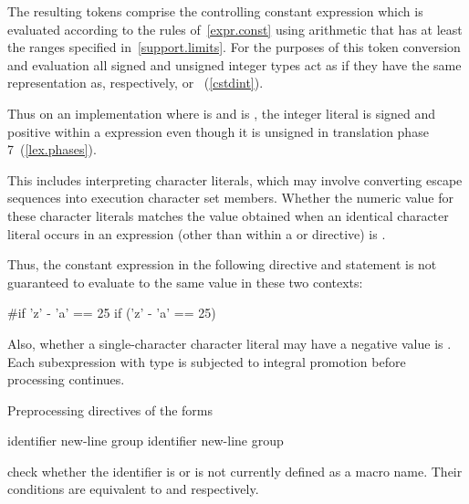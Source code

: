 \pnum
The resulting tokens comprise the controlling constant expression
which is evaluated according to the rules of~\ref{expr.const}
using arithmetic that has at least the ranges specified
in~\ref{support.limits}. For the purposes of this token conversion and evaluation
all signed and unsigned integer types
act as if they have the same representation as, respectively,
 or ~(\ref{cstdint}).
\begin{note}
Thus on an
implementation where  is 
and  is ,
the integer literal  is signed and positive within a 
expression even though it is unsigned in translation phase
7~(\ref{lex.phases}).
\end{note}
This includes interpreting character literals, which may involve
converting escape sequences into execution character set members.
Whether the numeric value for these character literals
matches the value obtained when an identical character literal
occurs in an expression
(other than within a
or
directive)
is .
\begin{note}
Thus, the constant expression in the following
directive and
statement is not guaranteed to evaluate to the same value in these two
contexts:
\begin{codeblock}
#if 'z' - 'a' == 25
if ('z' - 'a' == 25)
\end{codeblock}
\end{note}
Also, whether a single-character character literal may have a negative
value is .
Each subexpression with type
is subjected to integral promotion before processing continues.

\pnum
Preprocessing directives of the forms

\begin{ncbnftab}
\>\>identifier new-line group\opt\br
{}%
\>\>identifier new-line group\opt
{}%
\end{ncbnftab}

check whether the identifier is or is not currently defined as a macro name.
Their conditions are equivalent to
and
respectively.

